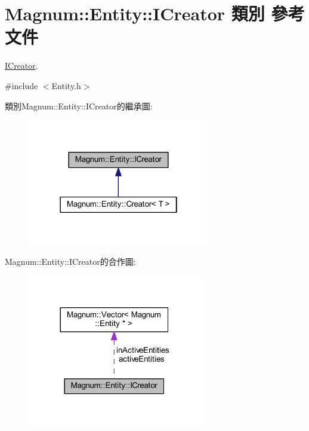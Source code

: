 \hypertarget{class_magnum_1_1_entity_1_1_i_creator}{}\section{Magnum\+:\+:Entity\+:\+:I\+Creator 類別 參考文件}
\label{class_magnum_1_1_entity_1_1_i_creator}


\hyperlink{class_magnum_1_1_entity_1_1_i_creator}{I\+Creator}.  




{\ttfamily \#include $<$Entity.\+h$>$}



類別\+Magnum\+:\+:Entity\+:\+:I\+Creator的繼承圖\+:\nopagebreak
\begin{figure}[H]
\begin{center}
\leavevmode
\includegraphics[width=226pt]{class_magnum_1_1_entity_1_1_i_creator__inherit__graph}
\end{center}
\end{figure}


Magnum\+:\+:Entity\+:\+:I\+Creator的合作圖\+:\nopagebreak
\begin{figure}[H]
\begin{center}
\leavevmode
\includegraphics[width=218pt]{class_magnum_1_1_entity_1_1_i_creator__coll__graph}
\end{center}
\end{figure}
